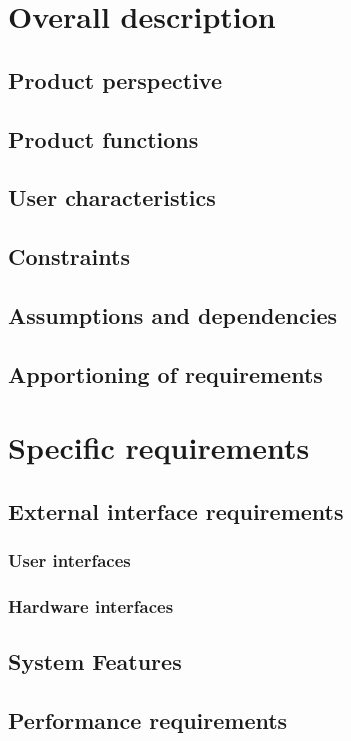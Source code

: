 \documentclass[10pt,journal,draftclsnofoot,onecolumn]{IEEEtran}
\begin{document}
	\section{Overall description}
	\subsection{Product perspective}
	\subsection{Product functions}
	\subsection{User characteristics}
	\subsection{Constraints}
	\subsection{Assumptions and dependencies}
	\subsection{Apportioning of requirements}
	
	\section{Specific requirements}
	
	\subsection{External interface requirements}
	\subsubsection{User interfaces}
	\subsubsection{Hardware interfaces}

	\subsection{System Features}	
	\subsection{Performance requirements}
\end{document}
